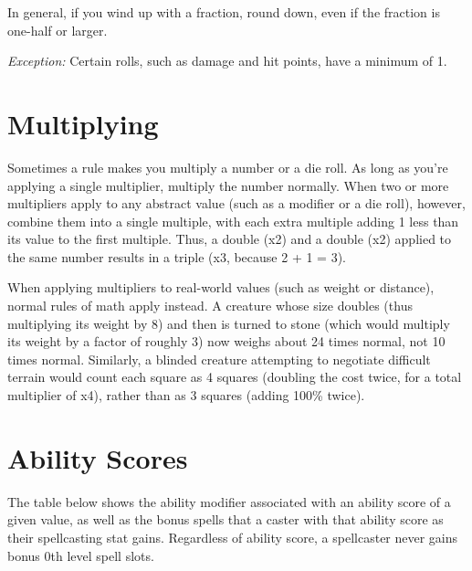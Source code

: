 In general, if you wind up with a fraction, round down, even if the fraction is 
one-half or larger.

\textit{Exception:} Certain rolls, such as damage and hit points, have a minimum 
of 1.

\section{Multiplying}

Sometimes a rule makes you multiply a number or a die roll. As long as you're applying 
a single multiplier, multiply the number normally. When two or more multipliers 
apply to any abstract value (such as a modifier or a die roll), however, combine 
them into a single multiple, with each extra multiple adding 1 less than its value 
to the first multiple. Thus, a double (x2) and a double (x2) 
applied to the same number results in a triple (x3, because 2 
+ 1 = 3).


When applying multipliers to real-world values (such as weight or distance), normal 
rules of math apply instead. A creature whose size doubles (thus multiplying its 
weight by 8) and then is turned to stone (which would multiply its weight by a 
factor of roughly 3) now weighs about 24 times normal, not 10 times normal. Similarly, 
a blinded creature attempting to negotiate difficult terrain would count each square 
as 4 squares (doubling the cost twice, for a total multiplier of x4), 
rather than as 3 squares (adding 100\% twice). 

\section{Ability Scores}

The table below shows the ability modifier associated with an ability score of a given value, as well as the bonus spells that a caster with that ability score as their spellcasting stat gains. Regardless of ability score, a spellcaster never gains bonus 0th level spell slots.


